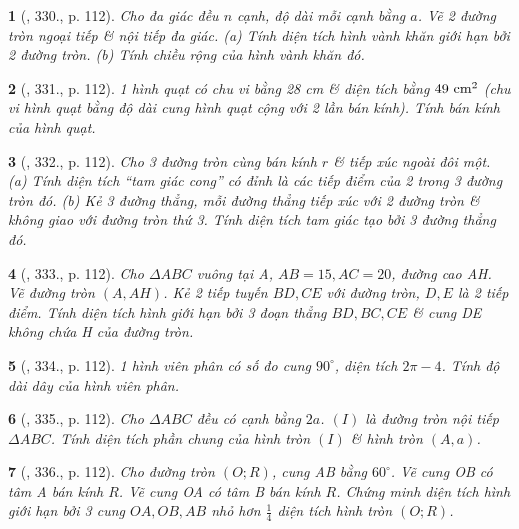 \documentclass{article}
\newtheorem{baitoan}{}
\begin{document}
\begin{baitoan}[\cite{Binh_Toan_9_tap_2}, 330., p. 112]
	Cho đa giác đều $n$ cạnh, độ dài mỗi cạnh bằng $a$. Vẽ 2 đường tròn ngoại tiếp \& nội tiếp đa giác. (a) Tính diện tích hình vành khăn giới hạn bởi 2 đường tròn. (b) Tính chiều rộng của hình vành khăn đó.
\end{baitoan}

\begin{baitoan}[\cite{Binh_Toan_9_tap_2}, 331., p. 112]
	1 hình quạt có chu vi bằng {\rm28 cm} \& diện tích bằng $\rm49\ cm^2$ (chu vi hình quạt bằng độ dài cung hình quạt cộng với 2 lần bán kính). Tính bán kính của hình quạt.
\end{baitoan}

\begin{baitoan}[\cite{Binh_Toan_9_tap_2}, 332., p. 112]
	Cho 3 đường tròn cùng bán kính $r$ \& tiếp xúc ngoài đôi một. (a) Tính diện tích ``tam giác cong'' có đỉnh là các tiếp điểm của 2 trong 3 đường tròn đó. (b) Kẻ 3 đường thẳng, mỗi đường thẳng tiếp xúc với 2 đường tròn \& không giao với đường tròn thứ 3. Tính diện tích tam giác tạo bởi 3 đường thẳng đó.
\end{baitoan}

\begin{baitoan}[\cite{Binh_Toan_9_tap_2}, 333., p. 112]
	Cho $\Delta ABC$ vuông tại A, $AB = 15,AC = 20$, đường cao AH. Vẽ đường tròn $(A,AH)$. Kẻ 2 tiếp tuyến $BD,CE$ với đường tròn, $D,E$ là 2 tiếp điểm. Tính diện tích hình giới hạn bởi 3 đoạn thẳng $BD,BC,CE$ \& cung DE không chứa H của đường tròn.
\end{baitoan}

\begin{baitoan}[\cite{Binh_Toan_9_tap_2}, 334., p. 112]
	1 hình viên phân có số đo cung $90^\circ$, diện tích $2\pi - 4$. Tính độ dài dây của hình viên phân.
\end{baitoan}

\begin{baitoan}[\cite{Binh_Toan_9_tap_2}, 335., p. 112]
	Cho $\Delta ABC$ đều có cạnh bằng $2a$. $(I)$ là đường tròn nội tiếp $\Delta ABC$. Tính diện tích phần chung của hình tròn $(I)$ \& hình tròn $(A,a)$.
\end{baitoan}

\begin{baitoan}[\cite{Binh_Toan_9_tap_2}, 336., p. 112]
	Cho đường tròn $(O;R)$, cung AB bằng $60^\circ$. Vẽ cung OB có tâm A bán kính $R$. Vẽ cung OA có tâm B bán kính $R$. Chứng minh diện tích hình giới hạn bởi 3 cung $OA,OB,AB$ nhỏ hơn $\frac{1}{4}$ diện tích hình tròn $(O;R)$.
\end{baitoan}
\end{document}
